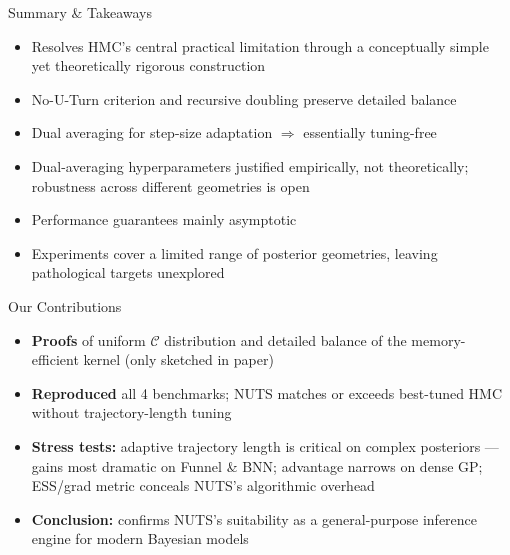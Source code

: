 \documentclass{beamer}
\begin{document}

\begin{frame}{Summary \& Takeaways}
  \noindent
    \begin{tcolorbox}[keybox, title=Paper strengths]
      \small
      \begin{itemize}
        \item Resolves HMC's central practical limitation through a conceptually simple yet theoretically rigorous construction
        \item No-U-Turn criterion and recursive doubling preserve detailed balance
        \item Dual averaging for step-size adaptation $\Rightarrow$ essentially tuning-free
      \end{itemize}
    \end{tcolorbox}

    \begin{tcolorbox}[warnbox, title=Limitations]
      \small
      \begin{itemize}
        \item Dual-averaging hyperparameters justified empirically, not theoretically; robustness across different geometries is open
        \item Performance guarantees mainly asymptotic
        \item Experiments cover a limited range of posterior geometries, leaving pathological targets unexplored
      \end{itemize}
    \end{tcolorbox}

\end{frame}

\begin{frame}{Our Contributions}
  \begin{tcolorbox}[keybox]
    \small
    \begin{itemize}
      \item \textbf{Proofs} of uniform $\mathcal{C}$ distribution and detailed balance of the memory-efficient kernel (only sketched in paper)
      \item \textbf{Reproduced} all 4 benchmarks; NUTS matches or exceeds best-tuned HMC without trajectory-length tuning
      \item \textbf{Stress tests:} adaptive trajectory length is critical on complex posteriors --- gains most dramatic on Funnel \& BNN; advantage narrows on dense GP; ESS/grad metric conceals NUTS's algorithmic overhead
      \item \textbf{Conclusion:} confirms NUTS's suitability as a general-purpose inference engine for modern Bayesian models
    \end{itemize}
  \end{tcolorbox}
\end{frame}
\end{document}
